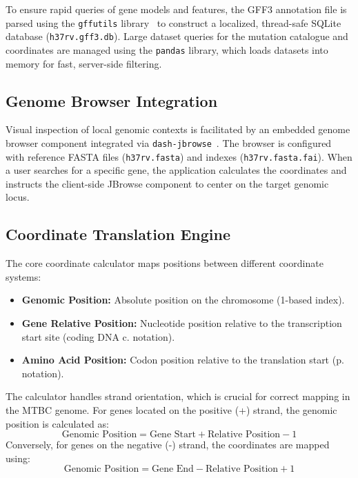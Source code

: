 \documentclass{article}
\begin{document}
To ensure rapid queries of gene models and features, the GFF3 annotation file is parsed using the \texttt{gffutils} library~\cite{gffutils} to construct a localized, thread-safe SQLite database (\texttt{h37rv.gff3.db}). Large dataset queries for the mutation catalogue and coordinates are managed using the \texttt{pandas} library, which loads datasets into memory for fast, server-side filtering. 

\subsection{Genome Browser Integration}
Visual inspection of local genomic contexts is facilitated by an embedded genome browser component integrated via \texttt{dash-jbrowse}~\cite{jbrowse2}. The browser is configured with reference FASTA files (\texttt{h37rv.fasta}) and indexes (\texttt{h37rv.fasta.fai}). When a user searches for a specific gene, the application calculates the coordinates and instructs the client-side JBrowse component to center on the target genomic locus.

\subsection{Coordinate Translation Engine}
The core coordinate calculator maps positions between different coordinate systems:
\begin{itemize}
    \item \textbf{Genomic Position:} Absolute position on the chromosome (1-based index).
    \item \textbf{Gene Relative Position:} Nucleotide position relative to the transcription start site (coding DNA c. notation).
    \item \textbf{Amino Acid Position:} Codon position relative to the translation start (p. notation).
\end{itemize}

The calculator handles strand orientation, which is crucial for correct mapping in the MTBC genome. For genes located on the positive (+) strand, the genomic position is calculated as:
\begin{equation}
    \text{Genomic Position} = \text{Gene Start} + \text{Relative Position} - 1
\end{equation}
Conversely, for genes on the negative (-) strand, the coordinates are mapped using:
\begin{equation}
    \text{Genomic Position} = \text{Gene End} - \text{Relative Position} + 1
\end{equation}
\end{document}
